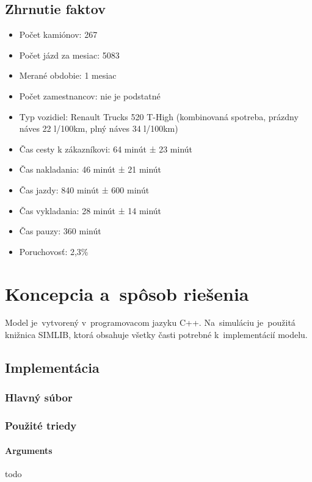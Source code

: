 \documentclass[a4paper, 11pt]{article}
\begin{document}
    \subsection{Zhrnutie faktov}
    \begin{itemize}
        \item Počet kamiónov: 267
        \item Počet jázd za mesiac: 5083
        \item Merané obdobie: 1 mesiac
        \item Počet zamestnancov: nie je podstatné
        \item Typ vozidiel: Renault Trucks 520 T-High (kombinovaná spotreba, prázdny náves 22 l/100km, plný náves 34 l/100km)
        \item Čas cesty k zákazníkovi: 64 minút ± 23 minút
        \item Čas nakladania: 46 minút ± 21 minút
        \item Čas jazdy: 840 minút ± 600 minút
        \item Čas vykladania: 28 minút ± 14 minút
        \item Čas pauzy: 360 minút
        \item Poruchovosť: 2,3\%
    \end{itemize}

	\newpage
    \section{Koncepcia a~spôsob riešenia}
	Model je~vytvorený v~programovacom jazyku C++. Na~simuláciu je~použitá knižnica
    SIMLIB, ktorá obsahuje všetky časti potrebné k~implementácií modelu.

    \subsection{Implementácia}

    \subsubsection{Hlavný súbor}

    \subsubsection{Použité triedy}
    \paragraph{Arguments}
    todo
\end{document}
